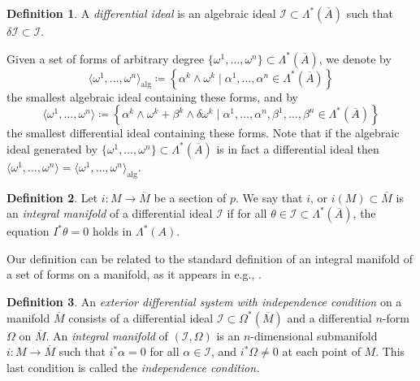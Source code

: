 \documentclass[11pt]{article}
\theoremstyle{plain}
\theoremstyle{definition}
\newtheorem{definition}{Definition}
\begin{document}
\begin{definition}
A \emph{differential ideal} is an algebraic ideal $\mathcal{I}\subset \Lambda^{\ast}(\overline{A})$ such that $\delta \mathcal{I}\subset \mathcal{I}$.
\end{definition}

Given a set of forms of arbitrary degree $\{\omega^1,\dots,\omega^n\}\subset \Lambda^{\ast}(\overline{A})$, we denote by
\begin{equation*}
    \langle \omega^1,\dots,\omega^n\rangle_{\mathrm{alg}}\coloneqq \left\{\alpha^k\wedge \omega^k\mid \alpha^1,\dots,\alpha^n\in \Lambda^{\ast}(\overline{A})\right\}
\end{equation*}
the smallest algebraic ideal containing these forms, and by
\begin{equation*}
    \langle \omega^1,\dots,\omega^n\rangle\coloneqq \left\{\alpha^k\wedge \omega^k+\beta^k\wedge \delta \omega^k\mid \alpha^1,\dots,\alpha^n,\beta^1,\dots,\beta^n\in \Lambda^{\ast}(\overline{A})\right\}
\end{equation*}
the smallest differential ideal containing these forms. Note that if the algebraic ideal generated by $\{\omega^1,\dots,\omega^n\}\subset \Lambda^{\ast}(\overline{A})$ is in fact a differential ideal then $\langle \omega^1,\dots,\omega^n\rangle=\langle \omega^1,\dots,\omega^n\rangle_{\mathrm{alg}}$.

\begin{definition}
Let $i\colon M\to \overline{M}$ be a section of $p$. We say that $i$, or $i(M)\subset \overline{M}$ is an \emph{integral manifold} of a differential ideal $\mathcal{I}$ if for all $\theta\in \mathcal{I}\subset \Lambda^{\ast}(\overline{A})$, the equation $I^{\ast}\theta=0$ holds in $\Lambda^{\ast}(A)$.
\end{definition}



Our definition can be related to the standard definition of an integral manifold of a set of forms on a manifold, as it appears in e.g., \cite{ivey2016cartan}. 

\begin{definition} \cite{ivey2016cartan}
An \emph{exterior differential system with independence condition} on a manifold $\overline M$ consists of a differential ideal $\mathcal{I}\subset \Omega^{\ast}(\overline M)$ and a differential $n$-form $\Omega$ on $\overline{M}$. An \emph{integral manifold} of $(\mathcal{I},\Omega)$ is an $n$-dimensional submanifold $i\colon M\to \overline M$ such that $i^{\ast}\alpha=0$ for all $\alpha\in \mathcal{I}$, and $i^{\ast}\Omega\neq 0$ at each point of $M$. This last condition is called the \emph{independence condition.}
 \end{definition}
\end{document}
